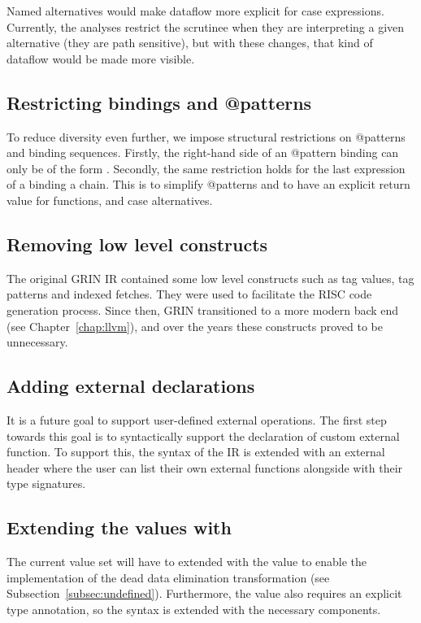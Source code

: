 \documentclass[main.tex]{subfiles}
\begin{document}
  Named alternatives would make dataflow more explicit for case expressions. Currently, the analyses restrict the scrutinee when they are interpreting a given alternative (they are path sensitive), but with these changes, that kind of dataflow would be made more visible.
  
  \subsection{Restricting bindings and @patterns}
  
  To reduce diversity even further, we impose structural restrictions on @patterns and binding sequences. Firstly, the right-hand side of an @pattern binding can only be of the form . Secondly, the same restriction holds for the last expression of a binding a chain. This is to simplify @patterns and to have an explicit return value for functions, and case alternatives.
  
  \subsection{Removing low level constructs}
  
  The original GRIN IR contained some low level constructs such as tag values, tag patterns and indexed fetches. They were used to facilitate the RISC code generation process. Since then, GRIN transitioned to a more modern back end (see Chapter~\ref{chap:llvm}), and over the years these constructs proved to be unnecessary.
  
  \subsection{Adding external declarations}
  
  It is a future goal to support user-defined external operations. The first step towards this goal is to syntactically support the declaration of custom external function. To support this, the syntax of the IR is extended with an external header where the user can list their own external functions alongside with their type signatures.
  
  \subsection{Extending the values with }
  
  The current value set will have to extended with the  value to enable the implementation of the dead data elimination transformation (see Subsection~\ref{subsec:undefined}). Furthermore, the  value also requires an explicit type annotation, so the syntax is extended with the necessary components.
\end{document}
